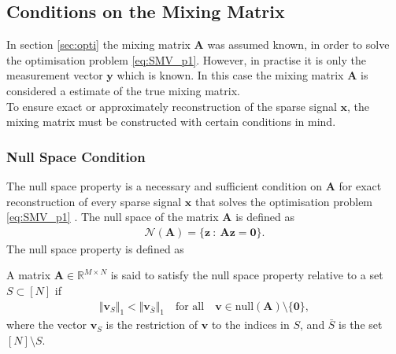 \subsection{Conditions on the Mixing Matrix}\label{sec:dic_conditions}
In section \ref{sec:opti} the mixing matrix $\mathbf{A}$ was assumed known, in order to solve the optimisation problem \eqref{eq:SMV_p1}. 
However, in practise it is only the measurement vector $\mathbf{y}$ which is known. 
In this case the mixing matrix $\mathbf{A}$ is considered a estimate of the true mixing matrix. 
\\
To ensure exact or approximately reconstruction of the sparse signal $\mathbf{x}$, the mixing matrix must be constructed with certain conditions in mind. 

\subsubsection{Null Space Condition}
The null space property is a necessary and sufficient condition on $\mathbf{A}$ for exact reconstruction of every sparse signal $\mathbf{x}$ that solves the optimisation problem \eqref{eq:SMV_p1} \cite[p. 77]{FR}. 
The null space of the matrix $\mathbf{A}$ is defined as
\begin{align*}
\mathcal{N}(\mathbf{A}) = \{ \mathbf{z} \ : \ \mathbf{Az} = \textbf{0} \}.
\end{align*} 
The null space property is defined as
\begin{definition}
A matrix $\mathbf{A} \in \mathbb{R}^{M \times N}$ is said to satisfy the null space property relative to a set $S \subset [N]$ if
\begin{align}
\Vert \mathbf{v}_S \Vert_1 < \Vert \mathbf{v}_{\overline{S}} \Vert_1 \quad \text{for all} \quad \mathbf{v} \in \text{null}(\mathbf{A}) \setminus \lbrace \mathbf{0} \rbrace,
\end{align}
where the vector $\mathbf{v}_S$ is the restriction of $\mathbf{v}$ to the indices in $S$, and $\bar{S}$ is the set $[N] \setminus S$. 
\end{definition}

